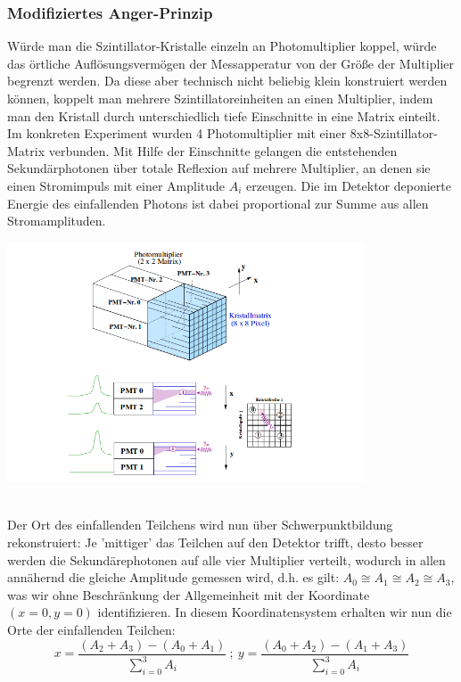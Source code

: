 		
\subsubsection{Modifiziertes Anger-Prinzip}
	Würde man die Szintillator-Kristalle einzeln an Photomultiplier koppel, würde das örtliche Auflösungsvermögen der Messapperatur von der Größe der Multiplier begrenzt werden. Da diese aber technisch nicht beliebig klein konstruiert werden können, koppelt man mehrere Szintillatoreinheiten an einen Multiplier, indem man den Kristall durch unterschiedlich tiefe Einschnitte in eine Matrix einteilt. Im konkreten Experiment wurden 4 Photomultiplier mit einer 8x8-Szintillator-Matrix verbunden. Mit Hilfe der Einschnitte gelangen die entstehenden Sekundärphotonen über totale Reflexion auf mehrere Multiplier, an denen sie einen Stromimpuls mit einer Amplitude $A_i$ erzeugen. Die im Detektor deponierte Energie des einfallenden Photons ist dabei proportional zur Summe aus allen Stromamplituden. \\
	
	\minipanf
					\begin{center}
						\includegraphics[width=0.8\textwidth, height=0.3\textheight]{pic/anger-prinzip.png}
						\label{PET-Prinzip}
					\end{center}
					\hspace{2mm}
	\minipend\\
	Der Ort des einfallenden Teilchens wird nun über Schwerpunktbildung rekonstruiert: Je 'mittiger' das Teilchen auf den Detektor trifft, desto besser werden die Sekundärephotonen auf alle vier Multiplier verteilt, wodurch in allen annähernd die gleiche Amplitude gemessen wird, d.h. es gilt: $A_0 \cong A_1 \cong A_2 \cong A_3$, was wir ohne Beschränkung der Allgemeinheit mit der Koordinate $(x = 0, y = 0)$ identifizieren. In diesem Koordinatensystem erhalten wir nun die Orte der einfallenden Teilchen:
	\begin{equation*}
	x = \frac{(A_2+A_3)-(A_0+A_1)}{\sum_{i=0}^{3} A_i}\ ;\ y = \frac{(A_0+A_2)-(A_1+A_3)}{\sum_{i=0}^{3} A_i}
	\end{equation*}